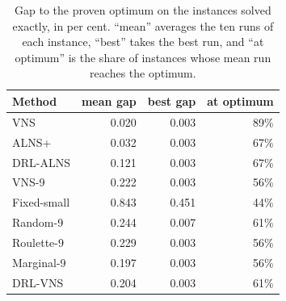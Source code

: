 \begin{table}[tb]
\centering
\caption{Gap to the proven optimum on the instances solved exactly, in per cent. ``mean'' averages the ten runs of each instance, ``best'' takes the best run, and ``at optimum'' is the share of instances whose mean run reaches the optimum.}
\label{tab:exactgaps}
\small
\begin{tabular}{@{}lrrr@{}}
\toprule
Method & mean gap & best gap & at optimum \\
\midrule
VNS & 0.020 & 0.003 & 89\% \\
ALNS+ & 0.032 & 0.003 & 67\% \\
DRL-ALNS & 0.121 & 0.003 & 67\% \\
VNS-9 & 0.222 & 0.003 & 56\% \\
Fixed-small & 0.843 & 0.451 & 44\% \\
Random-9 & 0.244 & 0.007 & 61\% \\
Roulette-9 & 0.229 & 0.003 & 56\% \\
Marginal-9 & 0.197 & 0.003 & 56\% \\
DRL-VNS & 0.204 & 0.003 & 61\% \\
\bottomrule
\end{tabular}
\end{table}
